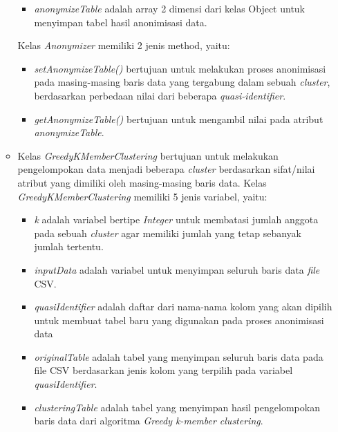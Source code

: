 \documentclass[a4paper,twoside]{article}
\begin{document}
\begin{enumerate}
\begin{itemize}
\begin{itemize}
\item \textit{anonymizeTable} adalah array 2 dimensi dari kelas Object untuk menyimpan tabel hasil anonimisasi data.

\end{itemize}

\noindent Kelas \textit{Anonymizer} memiliki 2 jenis method, yaitu:

\begin{itemize}

\item \textit{setAnonymizeTable()} bertujuan untuk melakukan proses anonimisasi pada masing-masing baris data yang tergabung dalam sebuah \textit{cluster}, berdasarkan perbedaan nilai dari beberapa \textit{quasi-identifier}.

\item \textit{getAnonymizeTable()} bertujuan untuk mengambil nilai pada atribut \textit{anonymizeTable}.

\end{itemize}

\item Kelas \textit{GreedyKMemberClustering} bertujuan untuk melakukan pengelompokan data menjadi beberapa \textit{cluster} berdasarkan sifat/nilai atribut yang dimiliki oleh masing-masing baris data. Kelas \textit{GreedyKMemberClustering} memiliki 5 jenis variabel, yaitu:

\begin{itemize}

\item \textit{k} adalah variabel bertipe \textit{Integer} untuk membatasi jumlah anggota pada sebuah \textit{cluster} agar memiliki jumlah yang tetap sebanyak jumlah tertentu.

\item \textit{inputData} adalah variabel untuk menyimpan seluruh baris data \textit{file} CSV.

\item \textit{quasiIdentifier} adalah daftar dari nama-nama kolom yang akan dipilih untuk membuat tabel baru yang digunakan pada proses anonimisasi data

\item \textit{originalTable} adalah tabel yang menyimpan seluruh baris data pada file CSV berdasarkan jenis kolom yang terpilih pada variabel \textit{quasiIdentifier}.

\item \textit{clusteringTable} adalah tabel yang menyimpan hasil pengelompokan baris data dari algoritma \textit{Greedy k-member clustering}.


\end{itemize}
\end{itemize}
\end{enumerate}
\end{document}
